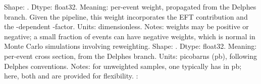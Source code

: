 {}
\markdownRendererSectionEnd \markdownRendererSectionBegin
{}\markdownRendererInterblockSeparator
{}\markdownRendererSectionBegin
{}\markdownRendererInterblockSeparator
{}\markdownRendererUlBeginTight
\markdownRendererUlItem Shape: .\markdownRendererUlItemEnd 
\markdownRendererUlItem Dtype: float32.\markdownRendererUlItemEnd 
\markdownRendererUlItem Meaning: per-event weight, propagated from the Delphes  branch. Given the pipeline, this weight incorporates the EFT contribution and the -dependent -factor.\markdownRendererUlItemEnd 
\markdownRendererUlItem Units: dimensionless.\markdownRendererUlItemEnd 
\markdownRendererUlItem Notes: weights may be positive or negative; a small fraction of events can have negative weights, which is normal in Monte Carlo simulations involving reweighting.\markdownRendererUlItemEnd 
\markdownRendererUlEndTight \markdownRendererInterblockSeparator
{}
\markdownRendererSectionEnd \markdownRendererSectionBegin
{}\markdownRendererInterblockSeparator
{}\markdownRendererUlBeginTight
\markdownRendererUlItem Shape: .\markdownRendererUlItemEnd 
\markdownRendererUlItem Dtype: float32.\markdownRendererUlItemEnd 
\markdownRendererUlItem Meaning: per-event cross section, from the Delphes  branch.\markdownRendererUlItemEnd 
\markdownRendererUlItem Units: picobarns (pb), following Delphes conventions.\markdownRendererUlItemEnd 
\markdownRendererUlItem Notes: for unweighted samples, one typically has  in pb; here, both  and  are provided for flexibility.\markdownRendererUlItemEnd 
\markdownRendererUlEndTight \markdownRendererInterblockSeparator
{}
\markdownRendererSectionEnd \markdownRendererSectionBegin
{}\markdownRendererInterblockSeparator
{}\markdownRendererUlBegin
\markdownRendererUlItem {}:\markdownRendererInterblockSeparator
